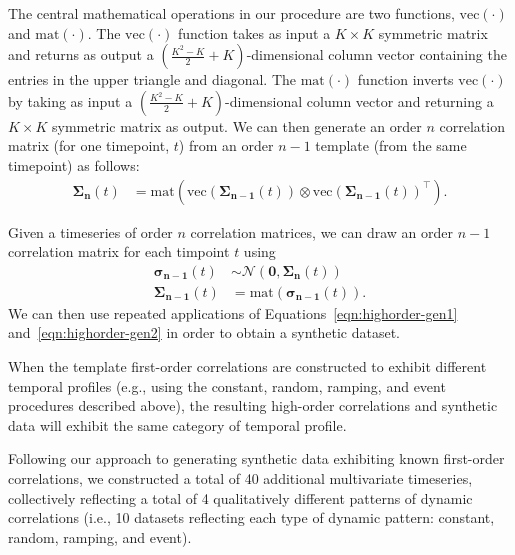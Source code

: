 \documentclass[english]{article}
\begin{document}
The central mathematical operations in our procedure are two
functions, $\mathrm{vec}(\cdot)$ and $\mathrm{mat}(\cdot)$.  The
$\mathrm{vec}(\cdot)$ function takes as input a $K \times K$ symmetric
matrix and returns as output a
$\left(\frac{K^2 - K}{2} + K\right)$-dimensional column vector
containing the entries in the upper triangle and diagonal.  The
$\mathrm{mat}(\cdot)$ function inverts $\mathrm{vec}(\cdot)$ by taking
as input a $\left(\frac{K^2 - K}{2} + K\right)$-dimensional column
vector and returning a $K \times K$ symmetric matrix as output.  We
can then generate an order $n$ correlation matrix (for one timepoint, $t$) from an order
$n - 1$ template (from the same timepoint) as follows:
\begin{align}
  \mathbf{\Sigma_{n}}(t) &= \mathrm{mat}(\mathrm{vec}(\mathbf{\Sigma_{n-1}}(t)) \otimes \mathrm{vec}(\mathbf{\Sigma_{n-1}}(t))^\top).\label{eqn:veccorr}
\end{align}

Given a timeseries of order $n$ correlation matrices, we can draw an
order $n-1$ correlation matrix for each timpoint $t$ using
\begin{align}
 \mathbf{\sigma_{n-1}}(t) &\sim \mathcal{N}\left(\mathbf{0}, \mathbf{\Sigma_n}(t)
                   \right)\label{eqn:highorder-gen1}\\
  \mathbf{\Sigma_{n-1}}(t) &= \mathrm{mat}(\mathbf{\sigma_{n-1}}(t)).\label{eqn:highorder-gen2}
  \end{align}
  We can then use repeated applications of
  Equations~\ref{eqn:highorder-gen1} and~\ref{eqn:highorder-gen2} in
  order to obtain a synthetic dataset.

 When the template first-order correlations are constructed to exhibit different
 temporal profiles (e.g., using the constant, random, ramping, and
 event procedures described above), the resulting high-order
 correlations and synthetic data will exhibit the same category of
 temporal profile.

 Following our approach to generating synthetic data exhibiting known
 first-order correlations, we constructed a total of 40 additional multivariate timeseries,
collectively reflecting a total of 4 qualitatively different patterns
of dynamic correlations (i.e., 10 datasets reflecting each type of
dynamic pattern: constant, random, ramping, and event).

 
\end{document}
